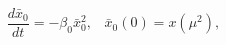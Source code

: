 \begin{equation}%
\frac{d\bar{x}_0}{dt} = - \beta_0 \bar{x}_0^2, \; \; \; \bar{x}_0 (0) =
x(\mu^2),
\end{equation}

